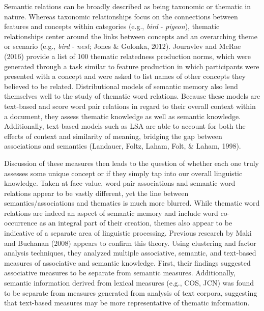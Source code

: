\documentclass[english,,man]{apa6}
\begin{document}
Semantic relations can be broadly described as being taxonomic or
thematic in nature. Whereas taxonomic relationships focus on the
connections between features and concepts within categories (e.g.,
\emph{bird} - \emph{pigeon}), thematic relationships center around the
links between concepts and an overarching theme or scenario (e.g.,
\emph{bird} - \emph{nest}; Jones \& Golonka, 2012). Jouravlev and McRae
(2016) provide a list of 100 thematic relatedness production norms,
which were generated through a task similar to feature production in
which participants were presented with a concept and were asked to list
names of other concepts they believed to be related. Distributional
models of semantic memory also lend themselves well to the study of
thematic word relations. Because these models are text-based and score
word pair relations in regard to their overall context within a
document, they assess thematic knowledge as well as semantic knowledge.
Additionally, text-based models such as LSA are able to account for both
the effects of context and similarity of meaning, bridging the gap
between associations and semantics (Landauer, Foltz, Laham, Folt, \&
Laham, 1998).

Discussion of these measures then leads to the question of whether each
one truly assesses some unique concept or if they simply tap into our
overall linguistic knowledge. Taken at face value, word pair
associations and semantic word relations appear to be vastly different,
yet the line between semantics/associations and thematics is much more
blurred. While thematic word relations are indeed an aspect of semantic
memory and include word co-occurrence as an integral part of their
creation, themes also appear to be indicative of a separate area of
linguistic processing. Previous research by Maki and Buchanan (2008)
appears to confirm this theory. Using clustering and factor analysis
techniques, they analyzed multiple associative, semantic, and text-based
measures of associative and semantic knowledge. First, their findings
suggested associative measures to be separate from semantic measures.
Additionally, semantic information derived from lexical measures (e.g.,
COS, JCN) was found to be separate from measures generated from analysis
of text corpora, suggesting that text-based measures may be more
representative of thematic information.
\end{document}
